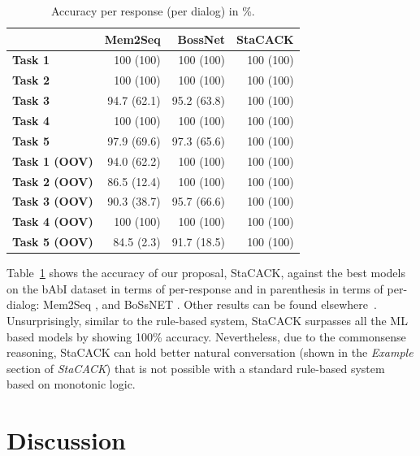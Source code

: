 \documentclass[letterpaper]{article}
\begin{document}
\begin{table}
\centering
\scriptsize
\setlength{\tabcolsep}{0.72em}
\begin{tabular}{|l|*{3}{r|}}
\hline
&  \textbf{Mem2Seq}
& \textbf{BossNet}
& \textbf{StaCACK}
\\[.82em]
\hline\hline
\textbf{Task 1}  & 100 (100) & 100 (100)  & 100 (100) \\\hline
\textbf{Task 2}  & 100 (100) & 100 (100)  & 100 (100) \\\hline
\textbf{Task 3}  & 94.7 (62.1) & 95.2 (63.8)  & 100 (100) \\\hline
\textbf{Task 4}  & 100 (100) & 100 (100)  & 100 (100) \\\hline
\textbf{Task 5}  & 97.9 (69.6) & 97.3 (65.6)  & 100 (100) \\\hline
\textbf{Task 1 (OOV)} & 94.0 (62.2) & 100 (100)   & 100 (100)\\\hline
\textbf{Task 2 (OOV)} & 86.5 (12.4)  & 100 (100) & 100 (100) \\\hline
\textbf{Task 3 (OOV)} & 90.3 (38.7) & 95.7 (66.6)  & 100 (100) \\\hline
\textbf{Task 4 (OOV)} & 100 (100) & 100 (100) & 100 (100) \\\hline
\textbf{Task 5 (OOV)} & 84.5 (2.3) & 91.7 (18.5)  & 100 (100) \\\hline

\end{tabular}

\caption{Accuracy per response (per dialog) in \%.}
\label{table:Stacack_compare}
\end{table}


Table~\ref{table:Stacack_compare} shows the accuracy of our proposal,
StaCACK, against the best models on the bAbI dataset in terms of
per-response and in parenthesis in terms of per-dialog: Mem2Seq
\cite{mem2seq}, and BoSsNET \cite{bossnet}. Other results can be found
elsewhere~\cite{babi_dialog}.
Unsurprisingly, similar to the rule-based system, StaCACK surpasses
all the ML based models by showing 100\% accuracy. Nevertheless, due
to the commonsense reasoning, StaCACK can hold better natural
conversation (shown in the \textit{Example} section of
\textit{StaCACK}) that is not possible with a standard rule-based
system based on monotonic logic.


\vspace{-3.32mm}
\section{Discussion}
\end{document}
